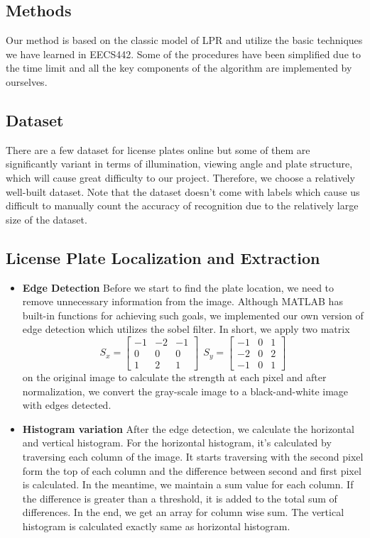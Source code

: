 \documentclass{article}
\begin{document}
\begin{spacing}{1.0}
\section{Methods}
Our method is based on the classic model of LPR and utilize the basic techniques we have learned in EECS442. Some of the procedures have been simplified due to the time limit and all the key components of the algorithm are implemented by ourselves.

\subsection{Dataset}
There are a few dataset for license plates online but some of them are significantly variant in terms of illumination, viewing angle and plate structure, which will cause great difficulty to our project. Therefore, we choose a relatively well-built dataset. Note that the dataset doesn't come with labels which cause us difficult to manually count the accuracy of recognition due to the relatively large size of the dataset.

\subsection{License Plate Localization and Extraction}
\begin{itemize}
	\item \textbf{Edge Detection} Before we start to find the plate location, we need to remove unnecessary information from the image. Although MATLAB has built-in functions for achieving such goals, we implemented our own version of edge detection which utilizes the sobel filter. In short, we apply two matrix
	$$
	S_x =
	\begin{bmatrix}
	-1 & -2 & -1 \\
	0 & 0 & 0 \\
	1 & 2 & 1
	\end{bmatrix}
	~~
	S_y = 
	\begin{bmatrix}
	-1 & 0 & 1 \\
	-2 & 0 & 2 \\
	-1 & 0 & 1
	\end{bmatrix}
	$$
	on the original image to calculate the strength at each pixel and after normalization, we convert the gray-scale image to a black-and-white image with edges detected.
	
	\item \textbf{Histogram variation}\cite{stackoverflow-extractplate} After the edge detection, we calculate the horizontal and vertical histogram. For the horizontal histogram, it's calculated by traversing each column of the image. It starts traversing with the second pixel form the top of each column and the difference between second and first pixel is calculated. In the meantime, we maintain a sum value for each column. If the difference is greater than a threshold, it is added to the total sum of differences. In the end, we get an array for column wise sum. The vertical histogram is calculated exactly same as horizontal histogram.
	

\end{itemize}
\end{spacing}
\end{document}
